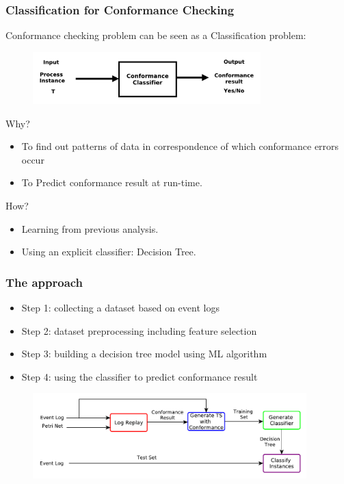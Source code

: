 \documentclass[10pt]{beamer}
\begin{document}
\begin{frame}
\frametitle{Classification for Conformance Checking}
Conformance checking problem can be seen as a Classification problem:

\begin{figure}
\includegraphics[width=250pt]{./item/classification.pdf}
\end{figure}

Why?
\begin{itemize}
\item To find out patterns of data in correspondence of which conformance errors occur
\item To Predict conformance result at run-time. 
\end{itemize}
How?
\begin{itemize}
\item Learning from previous analysis.
\item Using an explicit classifier: Decision Tree.
\end{itemize}
\end{frame}

\begin{frame}
\frametitle{The approach}
\begin{itemize}
\item {\color{red} Step 1}: collecting a dataset based on event logs
\item {\color{blue} Step 2}: dataset preprocessing including feature selection
\item {\color{green} Step 3}: building a decision tree model using ML algorithm
\item {\color{purple}Step 4}: using the classifier to predict conformance result
\end{itemize}
\smallskip
\smallskip\smallskip
\begin{figure}
\includegraphics[width=300pt]{./item/methodology.pdf}
\end{figure}
\end{frame}
\end{document}
